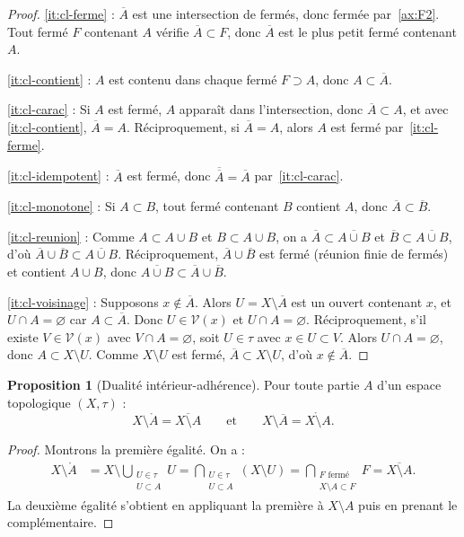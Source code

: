 \documentclass[12pt,a4paper,openany]{book}
\theoremstyle{definition}
\theoremstyle{cours}
\newtheorem{proposition}[theoreme]{Proposition}
\theoremstyle{coursnormal}
\newcommand{\Int}[1]{\mathring{#1}}
\newcommand{\Cl}[1]{\overline{#1}}
\newcommand{\Vois}[1]{\mathcal{V}(#1)}
\begin{document}
\begin{proof}
  \ref{it:cl-ferme} : $\Cl{A}$ est une intersection de fermés, donc fermée par~\ref{ax:F2}. Tout fermé $F$ contenant $A$ vérifie $\Cl{A} \subset F$, donc $\Cl{A}$ est le plus petit fermé contenant $A$.

  \ref{it:cl-contient} : $A$ est contenu dans chaque fermé $F \supset A$, donc $A \subset \Cl{A}$.

  \ref{it:cl-carac} : Si $A$ est fermé, $A$ apparaît dans l'intersection, donc $\Cl{A} \subset A$, et avec \ref{it:cl-contient}, $\Cl{A} = A$. Réciproquement, si $\Cl{A} = A$, alors $A$ est fermé par~\ref{it:cl-ferme}.

  \ref{it:cl-idempotent} : $\Cl{A}$ est fermé, donc $\Cl{\Cl{A}} = \Cl{A}$ par~\ref{it:cl-carac}.

  \ref{it:cl-monotone} : Si $A \subset B$, tout fermé contenant $B$ contient $A$, donc $\Cl{A} \subset \Cl{B}$.

  \ref{it:cl-reunion} : Comme $A \subset A \cup B$ et $B \subset A \cup B$, on a $\Cl{A} \subset \Cl{A \cup B}$ et $\Cl{B} \subset \Cl{A \cup B}$, d'où $\Cl{A} \cup \Cl{B} \subset \Cl{A \cup B}$. Réciproquement, $\Cl{A} \cup \Cl{B}$ est fermé (réunion finie de fermés) et contient $A \cup B$, donc $\Cl{A \cup B} \subset \Cl{A} \cup \Cl{B}$.

  \ref{it:cl-voisinage} : Supposons $x \notin \Cl{A}$. Alors $U = X \setminus \Cl{A}$ est un ouvert contenant $x$, et $U \cap A = \varnothing$ car $A \subset \Cl{A}$. Donc $U \in \Vois{x}$ et $U \cap A = \varnothing$. Réciproquement, s'il existe $V \in \Vois{x}$ avec $V \cap A = \varnothing$, soit $U \in \tau$ avec $x \in U \subset V$. Alors $U \cap A = \varnothing$, donc $A \subset X \setminus U$. Comme $X \setminus U$ est fermé, $\Cl{A} \subset X \setminus U$, d'où $x \notin \Cl{A}$.
\end{proof}

\begin{proposition}[Dualité intérieur-adhérence]\label{prop:dualite-int-cl}
  Pour toute partie $A$ d'un espace topologique $(X,\tau)$ :
  \[
    X \setminus \Int{A} = \Cl{X \setminus A} \qquad \text{et} \qquad X \setminus \Cl{A} = \Int{X \setminus A}.
  \]
\end{proposition}

\begin{proof}
  Montrons la première égalité. On a :
  \begin{align*}
    X \setminus \Int{A}
    &= X \setminus \bigcup_{\substack{U \in \tau \\ U \subset A}} U
    = \bigcap_{\substack{U \in \tau \\ U \subset A}} (X \setminus U)
    = \bigcap_{\substack{F \text{ fermé} \\ X \setminus A \subset F}} F
    = \Cl{X \setminus A}.
  \end{align*}
  La deuxième égalité s'obtient en appliquant la première à $X \setminus A$ puis en prenant le complémentaire.
\end{proof}
\end{document}
